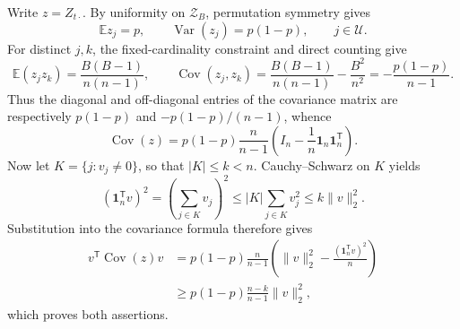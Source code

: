 Write \(z=Z_{t\cdot}\).  By uniformity on \(\mathcal Z_B\), permutation symmetry gives
\[
 \mathbb E z_j=p,
 \qquad
 \operatorname{Var}(z_j)=p(1-p),
 \qquad j\in\mathcal U.
\]
For distinct \(j,k\), the fixed-cardinality constraint and direct counting give
\[
 \mathbb E(z_jz_k)
 =\frac{B(B-1)}{n(n-1)},
 \qquad
 \operatorname{Cov}(z_j,z_k)
 =\frac{B(B-1)}{n(n-1)}-\frac{B^2}{n^2}
 =-\frac{p(1-p)}{n-1}.
\]
Thus the diagonal and off-diagonal entries of the covariance matrix are respectively \(p(1-p)\) and \(-p(1-p)/(n-1)\), whence
\[
 \operatorname{Cov}(z)
 =p(1-p)\frac{n}{n-1}
   \left(I_n-\frac1n\mathbf 1_n\mathbf 1_n^{\mathsf T}\right).
\]
Now let \(K=\{j:v_j\ne0\}\), so that \(|K|\le k<n\).  Cauchy--Schwarz on \(K\) yields
\[
 (\mathbf 1_n^{\mathsf T}v)^2
 =\left(\sum_{j\in K}v_j\right)^2
 \le |K|\sum_{j\in K}v_j^2
 \le k\lVert v\rVert_2^2.
\]
Substitution into the covariance formula therefore gives
\[
 \begin{aligned}
 v^{\mathsf T}\operatorname{Cov}(z)v
 &=p(1-p)\frac{n}{n-1}
   \left(\lVert v\rVert_2^2-\frac{(\mathbf 1_n^{\mathsf T}v)^2}{n}\right)\\
 &\ge p(1-p)\frac{n-k}{n-1}\lVert v\rVert_2^2,
 \end{aligned}
\]
which proves both assertions.